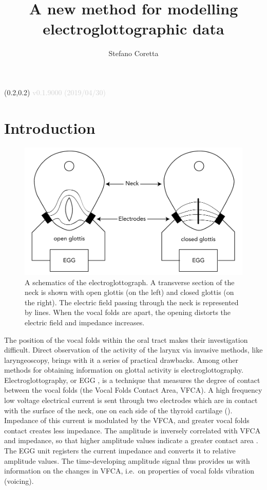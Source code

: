 \documentclass[
  11pt,
  a4paper,
]{article}
\title{A new method for modelling electroglottographic data}
\author{Stefano Coretta}
\date{}
\begin{document}
\begin{textblock}{3}(0.2,0.2)
  \textcolor{lightgray}{v0.1.9000 (2019/04/30)}
\end{textblock}
\maketitle

\hypertarget{introduction}{%
\section{Introduction}\label{introduction}}

\begin{figure}
  \centering
  \includegraphics{./img/egg-setup.pdf}
  \caption{A schematics of the electroglottograph. A transverse section of the neck is shown with open glottis (on the left) and closed glottis (on the right). The electric field passing through the neck is represented by lines. When the vocal folds are apart, the opening distorts the electric field and impedance increases.}
  \label{f:egg-setup}
\end{figure}

The position of the vocal folds within the oral tract makes their
investigation difficult. Direct observation of the activity of the
larynx via invasive methods, like laryngeoscopy, brings with it a series
of practical drawbacks. Among other methods for obtaining information on
glottal activity is electroglottography. Electroglottography, or EGG
\citep{fabre1957}, is a technique that measures the degree of contact
between the vocal folds (the Vocal Folds Contact Area, VFCA). A high
frequency low voltage electrical current is sent through two electrodes
which are in contact with the surface of the neck, one on each side of
the thyroid cartilage (). Impedance of this current is
modulated by the VFCA, and greater vocal folds contact creates less
impedance. The amplitude is inversely correlated with VFCA and
impedance, so that higher amplitude values indicate a greater contact
area \citep{titze1990}. The EGG unit registers the current impedance and
converts it to relative amplitude values. The time-developing amplitude
signal thus provides us with information on the changes in VFCA, i.e.~on
properties of vocal folds vibration (voicing).
\end{document}
